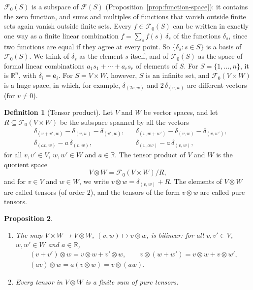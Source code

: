 \documentclass[11pt]{article}
\theoremstyle{definition}
\newtheorem{definition}{Definition}[section]
\theoremstyle{plain}
\newtheorem{proposition}[definition]{Proposition}
\theoremstyle{remark}
\begin{document}
$\mathcal{F}_0(S)$ is a subspace of $\mathcal{F}(S)$ (Proposition~\ref{prop:function-space}): it contains the zero function, and sums and multiples of functions that vanish outside finite sets again vanish outside finite sets. Every $f \in \mathcal{F}_0(S)$ can be written in exactly one way as a finite linear combination $f = \sum_s f(s)\,\delta_s$ of the functions $\delta_s$, since two functions are equal if they agree at every point. So $\{\delta_s : s \in S\}$ is a basis of $\mathcal{F}_0(S)$. We think of $\delta_s$ as the element $s$ itself, and of $\mathcal{F}_0(S)$ as the space of formal linear combinations $a_1s_1 + \cdots + a_rs_r$ of elements of $S$. For $S = \{1, \ldots, n\}$, it is $\mathbb{R}^n$, with $\delta_i = \mathbf{e}_i$. For $S = V \times W$, however, $S$ is an infinite set, and $\mathcal{F}_0(V \times W)$ is a huge space, in which, for example, $\delta_{(2v, w)}$ and $2\,\delta_{(v, w)}$ are different vectors (for $v \neq 0$).

\begin{definition}[Tensor product]\label{def:tensor-product}
    Let $V$ and $W$ be vector spaces, and let $R \subseteq \mathcal{F}_0(V \times W)$ be the subspace spanned by all the vectors
    \begin{align*}
        &\delta_{(v + v', w)} - \delta_{(v, w)} - \delta_{(v', w)}, && \delta_{(v, w + w')} - \delta_{(v, w)} - \delta_{(v, w')}, \\
        &\delta_{(av, w)} - a\,\delta_{(v, w)}, && \delta_{(v, aw)} - a\,\delta_{(v, w)},
    \end{align*}
    for all $v, v' \in V$, $w, w' \in W$ and $a \in \mathbb{R}$. The tensor product of $V$ and $W$ is the quotient space
    \[V \otimes W = \mathcal{F}_0(V \times W)/R,\]
    and for $v \in V$ and $w \in W$, we write $v \otimes w = \delta_{(v, w)} + R$. The elements of $V \otimes W$ are called tensors (of order $2$), and the tensors of the form $v \otimes w$ are called pure tensors.
\end{definition}

\begin{proposition}\label{prop:tensor-basic}
    \begin{enumerate}
        \item The map $V \times W \to V \otimes W$, $(v, w) \mapsto v \otimes w$, is bilinear: for all $v, v' \in V$, $w, w' \in W$ and $a \in \mathbb{R}$,
        \begin{gather*}
            (v + v') \otimes w = v \otimes w + v' \otimes w, \qquad v \otimes (w + w') = v \otimes w + v \otimes w', \\
            (av) \otimes w = a(v \otimes w) = v \otimes (aw).
        \end{gather*}
        \item Every tensor in $V \otimes W$ is a finite sum of pure tensors.
    \end{enumerate}
\end{proposition}
\end{document}
